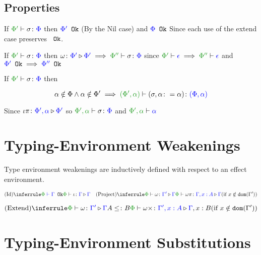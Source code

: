 \documentclass{report}
\begin{document}
    \subsection{Properties}
        
        \begin{property}[Wellformedness]\label{EffectSubsPropertyOne}
            If $\typerelation{\P'}{\si}{\P}$ then ${\color{blue} \Phi'} \texttt{ Ok}$ (By  the 
            Nil case) and ${\color{blue} \Phi} \texttt{ Ok}$ Since each use of the extend case preserves ${\color{blue} } \texttt{ Ok}$.
        \end{property}

        \begin{property}[Weakening]\label{EffectSubsPropertyTwo}
            If $\typerelation{\P'}{\si}{\P}$ then $\wrelw{\P'}{\P'} \implies \typerelation{\P''}{\si}{\P}$ since $\wellformed{\P'}{\e}\implies \wellformed{\P''}{\e}$ and ${\color{blue} \Phi'} \texttt{ Ok}\implies {\color{blue} \Phi''} \texttt{ Ok}$
        \end{property}

        \begin{property}[Extension]\label{EffectSubsPropertyThree}
            If $\typerelation{\P'}{\si}{\P}$ then
        
            \begin{equation}
                \a\notin\P\wedge\a\notin\P' \implies \typerelation{(\P', \a)}{(\si, \a\setto\a)}{(\P,\a)}
            \end{equation}

            Since $\iota\pi \colon {\color{blue}\Phi',\alpha} \triangleright {\color {blue} \Phi'}$ so $\typerelation{\P',\a}{\si}{\P}$ and $\wellformed{\P',\a}{\a}$        
        \end{property}

\section{Typing-Environment Weakenings}
Type environment weakenings are inductively defined with respect to an effect environment.


\[
    \ntreeruleI{Id}{\wellformedok{\P}{\G}}{\pewrel{\i}{\G}{\G}}
    \quad  
    \condtreeruleI{Project}{\pewrel{\w}{\G'}{\G}}{\pewrel{\w \pi}{\G, x: A}{\G}}{x \notin \dom{\G'}}
\]

\[
    \condtreeruleII{Extend}{\pewrel{\w}{\G'}{\G}}{ A \subtype B}{\pewrel{\w \x}{\G', x: A}{\G, x: B}}{x \notin \dom{\G'}}
\]

\section{Typing-Environment Substitutions}
\end{document}
